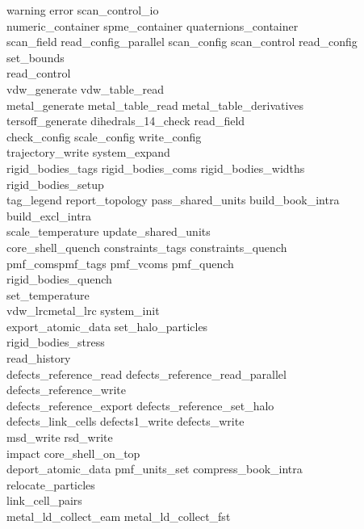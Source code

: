 \begin{itemize}
{\sc
warning error scan\_control\_io \\
numeric\_container spme\_container quaternions\_container \\
scan\_field read\_config\_parallel scan\_config scan\_control read\_config \\
set\_bounds \\
read\_control \\
vdw\_generate vdw\_table\_read \\
metal\_generate metal\_table\_read metal\_table\_derivatives \\
tersoff\_generate dihedrals\_14\_check read\_field \\
check\_config scale\_config write\_config \\
trajectory\_write system\_expand \\
rigid\_bodies\_tags rigid\_bodies\_coms rigid\_bodies\_widths \\
rigid\_bodies\_setup \\
tag\_legend report\_topology pass\_shared\_units build\_book\_intra \\
build\_excl\_intra \\
scale\_temperature update\_shared\_units \\
core\_shell\_quench constraints\_tags constraints\_quench \\
pmf\_comspmf\_tags pmf\_vcoms pmf\_quench \\
rigid\_bodies\_quench \\
set\_temperature \\
vdw\_lrcmetal\_lrc system\_init \\
export\_atomic\_data set\_halo\_particles \\
rigid\_bodies\_stress \\
read\_history \\
defects\_reference\_read defects\_reference\_read\_parallel \\
defects\_reference\_write \\
defects\_reference\_export defects\_reference\_set\_halo \\
defects\_link\_cells defects1\_write defects\_write \\
msd\_write rsd\_write \\
impact core\_shell\_on\_top \\
deport\_atomic\_data pmf\_units\_set compress\_book\_intra \\
relocate\_particles \\
link\_cell\_pairs \\
metal\_ld\_collect\_eam metal\_ld\_collect\_fst \\
}
\end{itemize}
